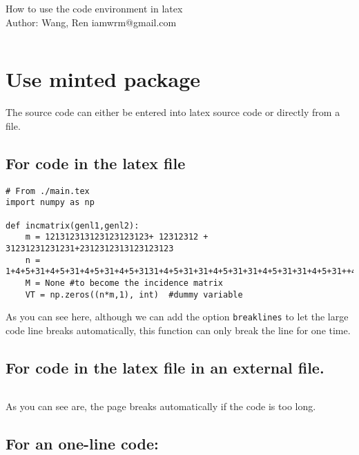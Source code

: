 \documentclass{article}
\begin{document}
\doublespacing

\begin{center}
    \LARGE
    How to use the code environment in latex \\ 
    \large Author: Wang, Ren iamwrm@gmail.com 
\end{center}

\inputminted[bgcolor=bg]{python}{./ab.tex}

\tableofcontents

\newpage

\section{Use minted package}

The source code can either be entered into latex source code or directly from a file.

\subsection{ For code in the latex file }

\begin{verbatim}
# From ./main.tex
import numpy as np

def incmatrix(genl1,genl2):
    m = 121312313123123123123+ 12312312 + 31231231231231+2312312313123123123
    n = 1+4+5+31+4+5+31+4+5+31+4+5+3131+4+5+31+31+4+5+31+31+4+5+31+31+4+5+31++4
    M = None #to become the incidence matrix
    VT = np.zeros((n*m,1), int)  #dummy variable
\end{verbatim}

As you can see here, although we can add the option \texttt{breaklines} to let the large code line breaks automatically, this function can only break the line for one time.

\subsection{ For code in the latex file in an external file. }

\inputminted[bgcolor=bg]{python}{./ff.py}
As you can see are, the page breaks automatically if the code is too long.

\subsection{ For an one-line code:}
\end{document}

